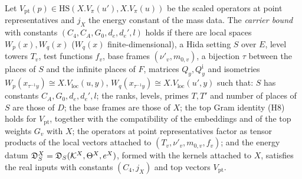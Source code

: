 \begin{definition}[Carriers]\label{pf:thmS-carrier:carrierfull}
Let $V_{\mathrm{pt}}(p)\in\mathrm{HS}(X.V_\pi(u'),X.V_\pi(u))$ be the scaled operators at point representatives and
$j_X$ the energy constant of the mass data. The \emph{carrier bound} with constants $(C_4,C_A,G_0,d_e,d_e',l)$
holds if there are local spaces $W_p(x),W_q(x)$ ($W_q(x)$ finite-dimensional), a Hida setting $S$ over $E$, level towers
$T_v$, test functions $f_v$, base frames $(\nu'_v,m_{0,v})$, a bijection $\tau$ between the places of $S$ and the
infinite places of $F$, matrices $Q_y,Q^{\mathrm i}_y$ and isometries $W_p(x_{\tau^{-1}y})\cong X.V_{\mathrm{loc}}(u,y)$,
$W_q(x_{\tau^{-1}y})\cong X.V_{\mathrm{loc}}(u',y)$ such that: $S$ has constants $C_A,G_0,d_e,d_e',l$; the ranks, levels,
primes $T,T'$ and number of places of $S$ are those of $D$; the base frames are those of $X$; the top Gram identity (H8)
holds for $V_{\mathrm{pt}}$, together with the compatibility of the embeddings and of the top weights $G_v$ with $X$; the
operators at point representatives factor as tensor products of the local vectors attached to $(T_v,\nu'_v,m_{0,v},f_v)$;
and the energy datum $\mathfrak{D}^X_S=\mathfrak{D}_S(\mathcal K^{X},\Theta^X,e^X)$, formed with the kernels attached to $X$, satisfies the real inputs with
constants $(C_4,j_X)$ and top vectors $V_{\mathrm{pt}}$.
\end{definition}

